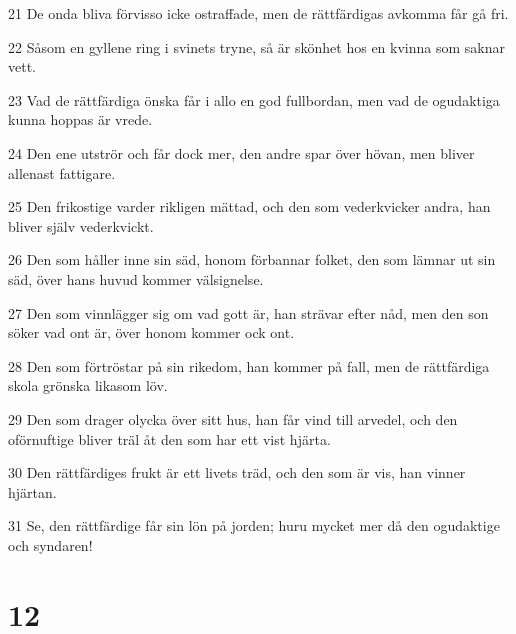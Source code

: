 \par 21 De onda bliva förvisso icke ostraffade, men de rättfärdigas avkomma får gå fri.
\par 22 Såsom en gyllene ring i svinets tryne, så är skönhet hos en kvinna som saknar vett.
\par 23 Vad de rättfärdiga önska får i allo en god fullbordan, men vad de ogudaktiga kunna hoppas är vrede.
\par 24 Den ene utströr och får dock mer, den andre spar över hövan, men bliver allenast fattigare.
\par 25 Den frikostige varder rikligen mättad, och den som vederkvicker andra, han bliver själv vederkvickt.
\par 26 Den som håller inne sin säd, honom förbannar folket, den som lämnar ut sin säd, över hans huvud kommer välsignelse.
\par 27 Den som vinnlägger sig om vad gott är, han strävar efter nåd, men den son söker vad ont är, över honom kommer ock ont.
\par 28 Den som förtröstar på sin rikedom, han kommer på fall, men de rättfärdiga skola grönska likasom löv.
\par 29 Den som drager olycka över sitt hus, han får vind till arvedel, och den oförnuftige bliver träl åt den som har ett vist hjärta.
\par 30 Den rättfärdiges frukt är ett livets träd, och den som är vis, han vinner hjärtan.
\par 31 Se, den rättfärdige får sin lön på jorden; huru mycket mer då den ogudaktige och syndaren!

\chapter{12}

